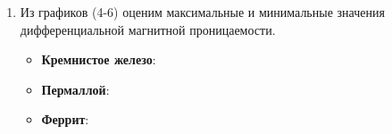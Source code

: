 \documentclass[12pt]{lab}
\begin{document}
\begin{enumerate}
\begin{itemize}

        \end{itemize}

    \item Из графиков (4-6) оценим максимальные и минимальные значения
        дифференциальной магнитной проницаемости.

        \begin{itemize}
            \item   \textbf{Кремнистое железо}:


            \item  \textbf{Пермаллой}:


            \item  \textbf{Феррит}:


        \end{itemize}

\end{enumerate}
\end{document}
